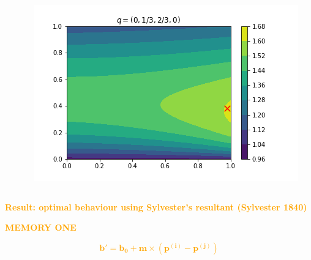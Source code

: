 \documentclass{beamer}
\begin{document}
\begin{frame}
    \begin{columns}
        \begin{column}{.5\textwidth}
            
        \end{column}
        \begin{column}{.5\textwidth}
            \includegraphics[width=\textwidth]{reactive}
        \end{column}
    \end{columns}
    \pause
    \centering
    \vspace{2mm}
    \textbf{\textcolor{orange}{Result: optimal behaviour using Sylvester's resultant (Sylvester 1840)}}
\end{frame}

\begin{frame}
    \begin{center}
    \Large{
    \textbf{\textcolor{orange}{MEMORY ONE}}}
    \end{center}
\end{frame}

\begin{frame}
    \begin{center}
        \vspace{-.5cm}
        \textcolor{orange}{
        \[\mathbf{ b'= b_0 + m \times (p^{(i)} - p^{(j)})}\]}
        \vspace{.1cm}

        
    \end{center}
\end{frame}
\end{document}
